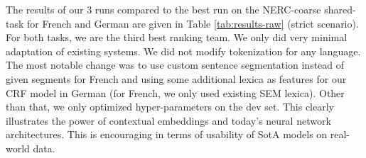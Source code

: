 The results of our 3 runs compared to the best run on the NERC-coarse shared-task for French and German are given in Table \ref{tab:results-raw} (strict scenario).
For both tasks, we are the third best ranking team.
We only did very minimal adaptation of existing systems. We did not modify tokenization for any language. The most notable change was to use custom sentence segmentation instead of given segments for French and using some additional lexica as features for our CRF model in German (for French, we only used existing SEM lexica). Other than that, we only optimized hyper-parameters on the dev set. This clearly illustrates the power of contextual embeddings and today's neural network architectures. This is encouraging in terms of usability of SotA models on real-world data.

